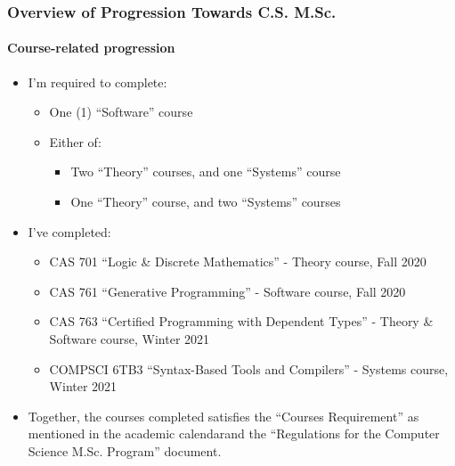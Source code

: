 \documentclass{beamer}
\begin{document}
\begin{frame}
    \frametitle{Overview of Progression Towards C.S. M.Sc.}
    \framesubtitle{Course-related progression}
    \begin{itemize}
        \item<1-> I'm required to complete\footnotemark[1]:
            \begin{itemize}
                \item<2-> One (1) ``Software'' course
                \item<3-> Either of:
                    \begin{itemize}
                        \item<4-> Two ``Theory'' courses, and one ``Systems'' course
                        \item<4-> One ``Theory'' course, and two ``Systems'' courses
                    \end{itemize}
            \end{itemize}
        \item<5-> I've completed:
            \begin{itemize}
                \item<6-> CAS 701 ``Logic \& Discrete Mathematics'' - Theory course, Fall 2020
                \item<6-> CAS 761 ``Generative Programming'' - Software course, Fall 2020
                \item<6-> CAS 763 ``Certified Programming with Dependent Types'' - Theory \& Software course, Winter 2021
                \item<6-> COMPSCI 6TB3 ``Syntax-Based Tools and Compilers'' - Systems course, Winter 2021
            \end{itemize}
        \item<7-> Together, the courses completed satisfies the ``Courses Requirement'' as mentioned in the academic calendar\footnotemark[1] and the ``Regulations for the Computer Science M.Sc. Program'' document\footnotemark[2].
    \end{itemize}

\end{frame}
\end{document}
